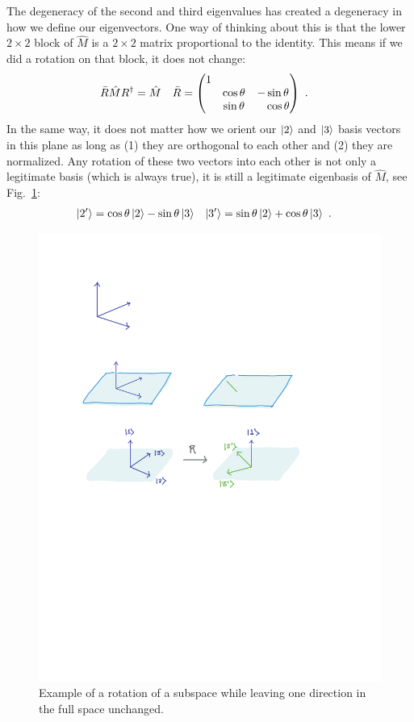 \documentclass[12pt, oneside]{report}    %
\begin{document}
The degeneracy of the second and third eigenvalues has created a degeneracy in how we define our eigenvectors. One way of thinking about this is that the lower $2\times 2$ block of $\hat M$ is a $2\times 2$ matrix proportional to the identity. This means if we did a rotation on that block, it does not change:
\begin{align}
    \bar R \hat M R^\dag &= \hat M
    &
    \bar R&=
    \begin{pmatrix}
        1 & & \\
        & \cos\theta & -\sin\theta \\
        & \sin\theta & \pp \cos\theta
     \end{pmatrix} \ .
     \label{eq:rot:lower:2}
\end{align}
In the same way, it does not matter how we orient our $\left|2\right\rangle$ and $\left|3\right\rangle$ basis vectors in this plane as long as (1) they are orthogonal to each other and (2) they are normalized. Any rotation of these two vectors into each other is not only a legitimate basis (which is always true), it is still a legitimate eigenbasis of $\hat M$, see Fig.~\ref{fig:det:eig:rot}:
\begin{align}
    \left|2'\right\rangle &= \cos\theta \left|2\right\rangle -\sin\theta \left|3\right\rangle
    &
    \left|3'\right\rangle &= \sin\theta \left|2\right\rangle +\cos\theta \left|3\right\rangle \ .
\end{align}
% 
\begin{figure}[tb]
    \centering
    \includegraphics[width=.8\textwidth]{figures/deg_eig_rot.pdf}
    \caption{Example of a rotation of a subspace while leaving one direction in the full space unchanged.}
    \label{fig:det:eig:rot}
\end{figure}
% 
\end{document}
